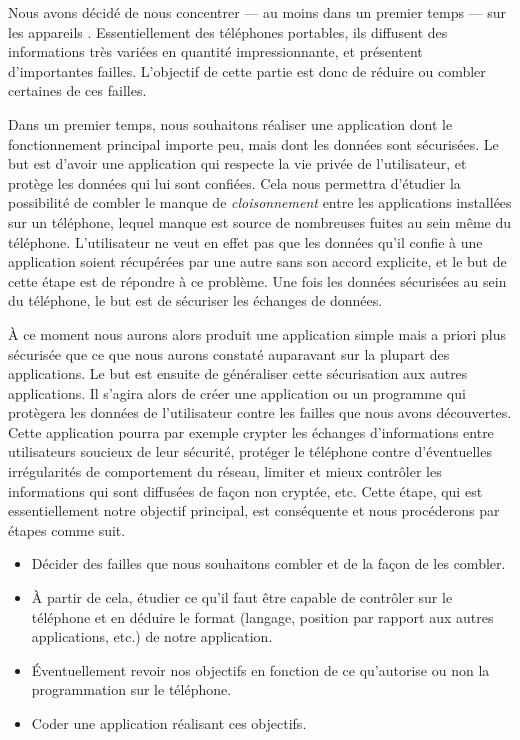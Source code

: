 \documentclass[a4paper, 12pt,twoside]{article}
\begin{document}
		Nous avons décidé de nous concentrer — au moins dans un premier temps — sur les appareils \Android{}. Essentiellement des téléphones portables, ils diffusent des informations très variées en quantité impressionnante, et présentent d'importantes failles. L'objectif de cette partie est donc de réduire ou combler certaines de ces failles.
		
		Dans un premier temps, nous souhaitons réaliser une application dont le fonctionnement principal importe peu, mais dont les données sont sécurisées. Le but est d'avoir une application qui respecte la vie privée de l'utilisateur, et protège les données qui lui sont confiées. Cela nous permettra d'étudier la possibilité de combler le manque de \emph{cloisonnement} entre les applications installées sur un téléphone, lequel manque est source de nombreuses fuites au sein même du téléphone. L'utilisateur ne veut en effet pas que les données qu'il confie à une application soient récupérées par une autre sans son accord explicite, et le but de cette étape est de répondre à ce problème. Une fois les données sécurisées au sein du téléphone, le but est de sécuriser les échanges de données.
		
		À ce moment nous aurons alors produit une application simple mais a priori plus sécurisée que ce que nous aurons constaté auparavant sur la plupart des applications. Le but est ensuite de généraliser cette sécurisation aux autres applications. Il s'agira alors de créer une application ou un programme qui protègera les données de l'utilisateur contre les failles que nous avons découvertes. Cette application pourra par exemple crypter les échanges d'informations entre utilisateurs soucieux de leur sécurité, protéger le téléphone contre d'éventuelles irrégularités de comportement du réseau, limiter et mieux contrôler les informations qui sont diffusées de façon non cryptée, etc. Cette étape, qui est essentiellement notre objectif principal, est conséquente et nous procéderons par étapes comme suit.
		
		\begin{itemize}\setlength{\parskip}{0pt}
			\item Décider des failles que nous souhaitons combler et de la façon de les combler.
			\item À partir de cela, étudier ce qu'il faut être capable de contrôler sur le téléphone et en déduire le format (langage, position par rapport aux autres applications, etc.) de notre application.
			\item Éventuellement revoir nos objectifs en fonction de ce qu'autorise ou non la programmation sur le téléphone.
			\item Coder une application réalisant ces objectifs.
		\end{itemize}
		
\end{document}
